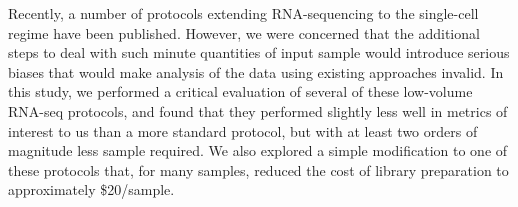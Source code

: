 Recently, a number of protocols extending RNA-sequencing to the single-cell regime have been published.  However, we were concerned that the additional steps to deal with such minute quantities of input sample would introduce serious biases that would make analysis of the data using existing approaches invalid.  In this study, we performed a critical evaluation of several of these low-volume RNA-seq protocols, and found that they performed slightly less well in metrics of interest to us than a more standard protocol, but with at least two orders of magnitude less sample required. We also explored a simple modification to one of these protocols that, for many samples, reduced the cost of library preparation to approximately \$20/sample.